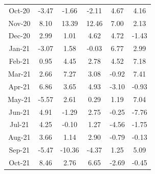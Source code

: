 \documentclass[UTF8]{ctexart}
\begin{document}
\begin{appendices}
{\begin{longtable}[c]{cccccc}
    Oct-20 & -3.47     & -1.66     & -2.11  & 4.67  & 4.16      \\
    Nov-20 & 8.10      & 13.39     & 12.46  & 7.00  & 2.13      \\
    Dec-20 & 2.99      & 1.01      & 4.62   & 4.72  & -1.43     \\
    Jan-21 & -3.07     & 1.58      & -0.03  & 6.77  & 2.99      \\
    Feb-21 & 0.95      & 4.45      & 2.78   & 4.52  & 7.18      \\
    Mar-21 & 2.66      & 7.27      & 3.08   & -0.92 & 7.41      \\
    Apr-21 & 6.86      & 3.65      & 4.93   & -3.10 & -0.93     \\
    May-21 & -5.57     & 2.61      & 0.29   & 1.19  & 7.04      \\
    Jun-21 & 4.91      & -1.29     & 2.75   & -0.25 & -7.76     \\
    Jul-21 & 4.25      & -0.10     & 1.27   & -4.56 & -1.75     \\
    Aug-21 & 3.66      & 1.14      & 2.90   & -0.79 & -0.13     \\
    Sep-21 & -5.47     & -10.36    & -4.37  & 1.25  & 5.09      \\
    Oct-21 & 8.46      & 2.76      & 6.65   & -2.69 & -0.45     \\* \bottomrule
  \end{longtable}}

\end{appendices}
\end{document}
